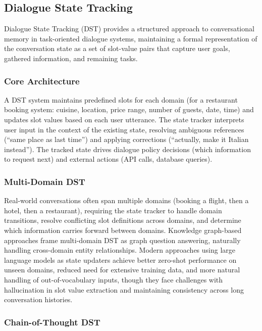 \documentclass[11pt,letterpaper]{article}
\begin{document}
\subsection{Dialogue State Tracking}

Dialogue State Tracking (DST) provides a structured approach to conversational memory in task-oriented dialogue systems, maintaining a formal representation of the conversation state as a set of slot-value pairs that capture user goals, gathered information, and remaining tasks.

\subsubsection{Core Architecture}

A DST system maintains predefined slots for each domain (for a restaurant booking system: cuisine, location, price range, number of guests, date, time) and updates slot values based on each user utterance. The state tracker interprets user input in the context of the existing state, resolving ambiguous references (``same place as last time'') and applying corrections (``actually, make it Italian instead''). The tracked state drives dialogue policy decisions (which information to request next) and external actions (API calls, database queries).

\subsubsection{Multi-Domain DST}

Real-world conversations often span multiple domains (booking a flight, then a hotel, then a restaurant), requiring the state tracker to handle domain transitions, resolve conflicting slot definitions across domains, and determine which information carries forward between domains. Knowledge graph-based approaches frame multi-domain DST as graph question answering, naturally handling cross-domain entity relationships. Modern approaches using large language models as state updaters achieve better zero-shot performance on unseen domains, reduced need for extensive training data, and more natural handling of out-of-vocabulary inputs, though they face challenges with hallucination in slot value extraction and maintaining consistency across long conversation histories.

\subsubsection{Chain-of-Thought DST}
\end{document}
